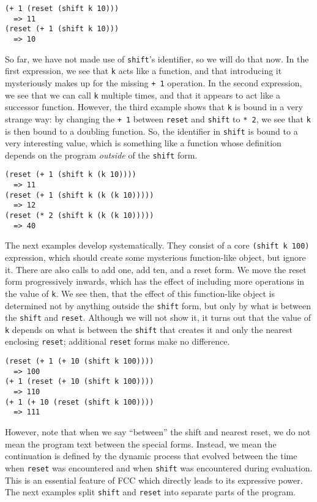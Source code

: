 \documentclass[11pt]{article}
\begin{document}
\begin{verbatim}
(+ 1 (reset (shift k 10)))
  => 11
(reset (+ 1 (shift k 10)))
  => 10
\end{verbatim}

So far, we have not made use of \texttt{shift}'s identifier, so we will do that now.
In the first expression, we see that \texttt{k} acts like a function, and that introducing it mysteriously makes up for the missing \texttt{+ 1} operation.
In the second expression, we see that we can call \texttt{k} multiple times, and that it appears to act like a successor function.
However, the third example shows that \texttt{k} is bound in a very strange way:
by changing the \texttt{+ 1} between \texttt{reset} and \texttt{shift} to \texttt{* 2}, we see that \texttt{k} is then bound to a doubling function.
So, the identifier in \texttt{shift} is bound to a very interesting value, which is something like a function whose definition depends on the program \emph{outside} of the \texttt{shift} form.

\begin{verbatim}
(reset (+ 1 (shift k (k 10))))
  => 11
(reset (+ 1 (shift k (k (k 10)))))
  => 12
(reset (* 2 (shift k (k (k 10)))))
  => 40
\end{verbatim}

The next examples develop systematically.
They consist of a core \texttt{(shift k 100)} expression, which should create some mysterious function-like object, but ignore it.
There are also calls to add one, add ten, and a reset form.
We move the reset form progressively inwards, which has the effect of including more operations in the value of \texttt{k}.
We see then, that the effect of this function-like object is determined not by anything outside the \texttt{shift} form, but only by what is between the \texttt{shift} and \texttt{reset}.
Although we will not show it, it turns out that the value of \texttt{k} depends on what is between the \texttt{shift} that creates it and only the nearest enclosing \texttt{reset}; additional \texttt{reset} forms make no difference.

\begin{verbatim}
(reset (+ 1 (+ 10 (shift k 100))))
  => 100
(+ 1 (reset (+ 10 (shift k 100))))
  => 110
(+ 1 (+ 10 (reset (shift k 100))))
  => 111
\end{verbatim}

However, note that when we say ``between'' the shift and nearest reset, we do not mean the program text between the special forms.
Instead, we mean the continuation is defined by the dynamic process that evolved between the time when \texttt{reset} was encountered and when \texttt{shift} was encountered during evaluation.
This is an essential feature of FCC which directly leads to its expressive power.
The next examples split \texttt{shift} and \texttt{reset} into separate parts of the program.
\end{document}
